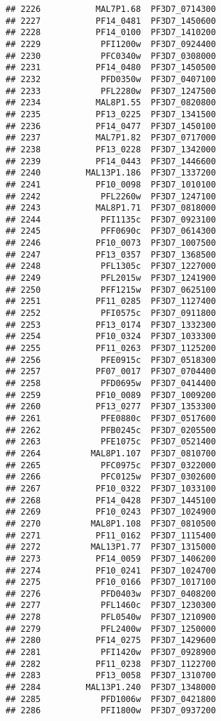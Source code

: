 \documentclass[12pt, a4paper]{article}\usepackage[]{graphicx}\usepackage[]{color}
\makeatletter
\newenvironment{kframe}{%
 \def\at@end@of@kframe{}%
 \ifinner\ifhmode%
  \def\at@end@of@kframe{\end{minipage}}%
  \begin{minipage}{\columnwidth}%
 \fi\fi%
 \def\FrameCommand##1{\hskip\@totalleftmargin \hskip-\fboxsep
 \colorbox{shadecolor}{##1}\hskip-\fboxsep
     \hskip-\linewidth \hskip-\@totalleftmargin \hskip\columnwidth}%
 \MakeFramed {\advance\hsize-\width
   \@totalleftmargin\z@ \linewidth\hsize
   \@setminipage}}%
 {\par\unskip\endMakeFramed%
 \at@end@of@kframe}
\newenvironment{knitrout}{}{} %
\makeatother
\begin{document}
\begin{knitrout}
\begin{kframe}
\begin{verbatim}
## 2226           MAL7P1.68  PF3D7_0714300
## 2227           PF14_0481  PF3D7_1450600
## 2228           PF14_0100  PF3D7_1410200
## 2229            PFI1200w  PF3D7_0924400
## 2230            PFC0340w  PF3D7_0308000
## 2231           PF14_0480  PF3D7_1450500
## 2232            PFD0350w  PF3D7_0407100
## 2233            PFL2280w  PF3D7_1247500
## 2234           MAL8P1.55  PF3D7_0820800
## 2235           PF13_0225  PF3D7_1341500
## 2236           PF14_0477  PF3D7_1450100
## 2237           MAL7P1.82  PF3D7_0717000
## 2238           PF13_0228  PF3D7_1342000
## 2239           PF14_0443  PF3D7_1446600
## 2240         MAL13P1.186  PF3D7_1337200
## 2241           PF10_0098  PF3D7_1010100
## 2242            PFL2260w  PF3D7_1247100
## 2243           MAL8P1.71  PF3D7_0818000
## 2244            PFI1135c  PF3D7_0923100
## 2245            PFF0690c  PF3D7_0614300
## 2246           PF10_0073  PF3D7_1007500
## 2247           PF13_0357  PF3D7_1368500
## 2248            PFL1305c  PF3D7_1227000
## 2249            PFL2015w  PF3D7_1241900
## 2250            PFF1215w  PF3D7_0625100
## 2251           PF11_0285  PF3D7_1127400
## 2252            PFI0575c  PF3D7_0911800
## 2253           PF13_0174  PF3D7_1332300
## 2254           PF10_0324  PF3D7_1033300
## 2255           PF11_0263  PF3D7_1125200
## 2256            PFE0915c  PF3D7_0518300
## 2257           PF07_0017  PF3D7_0704400
## 2258            PFD0695w  PF3D7_0414400
## 2259           PF10_0089  PF3D7_1009200
## 2260           PF13_0277  PF3D7_1353300
## 2261            PFE0880c  PF3D7_0517600
## 2262            PFB0245c  PF3D7_0205500
## 2263            PFE1075c  PF3D7_0521400
## 2264          MAL8P1.107  PF3D7_0810700
## 2265            PFC0975c  PF3D7_0322000
## 2266            PFC0125w  PF3D7_0302600
## 2267           PF10_0322  PF3D7_1033100
## 2268           PF14_0428  PF3D7_1445100
## 2269           PF10_0243  PF3D7_1024900
## 2270          MAL8P1.108  PF3D7_0810500
## 2271           PF11_0162  PF3D7_1115400
## 2272          MAL13P1.77  PF3D7_1315000
## 2273           PF14_0059  PF3D7_1406200
## 2274           PF10_0241  PF3D7_1024700
## 2275           PF10_0166  PF3D7_1017100
## 2276            PFD0403w  PF3D7_0408200
## 2277            PFL1460c  PF3D7_1230300
## 2278            PFL0540w  PF3D7_1210900
## 2279            PFL2400w  PF3D7_1250000
## 2280           PF14_0275  PF3D7_1429600
## 2281            PFI1420w  PF3D7_0928900
## 2282           PF11_0238  PF3D7_1122700
## 2283           PF13_0058  PF3D7_1310700
## 2284         MAL13P1.240  PF3D7_1348000
## 2285            PFD1006w  PF3D7_0421800
## 2286            PFI1800w  PF3D7_0937200

\end{verbatim}
\end{kframe}
\end{knitrout}
\end{document}
